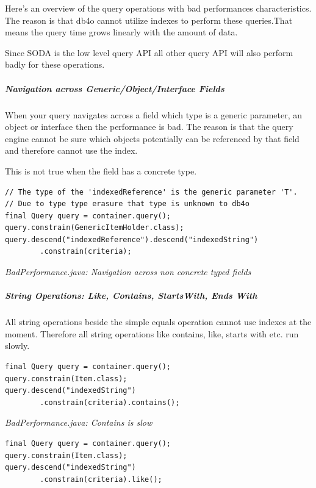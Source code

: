 Here's an overview of the query operations with bad performances characteristics. The reason is that db4o cannot utilize indexes to perform these queries.That means the query time grows linearly with the amount of data.

Since SODA is the low level query API all other query API will also perform badly for these operations.

\subparagraph*{Navigation across Generic/Object/Interface Fields}

When your query navigates across a field which type is a generic parameter, an object or interface then the performance is bad. The reason is that the query engine cannot be sure which objects potentially can be referenced by that field and therefore cannot use the index.

This is not true when the field has a concrete type.

\begin{lstlisting}
// The type of the 'indexedReference' is the generic parameter 'T'.
// Due to type type erasure that type is unknown to db4o
final Query query = container.query();
query.constrain(GenericItemHolder.class);
query.descend("indexedReference").descend("indexedString")
        .constrain(criteria);
\end{lstlisting}

{\small\itshape BadPerformance.java: Navigation across non concrete typed fields\par}
\medskip

\subparagraph*{String Operations: Like, Contains, StartsWith, Ends With}

All string operations beside the simple equals operation cannot use indexes at the moment. Therefore all string operations like contains, like, starts with etc. run slowly.

\begin{lstlisting}
final Query query = container.query();
query.constrain(Item.class);
query.descend("indexedString")
        .constrain(criteria).contains();
\end{lstlisting}

{\small\itshape BadPerformance.java: Contains is slow\par}
\medskip

\begin{lstlisting}
final Query query = container.query();
query.constrain(Item.class);
query.descend("indexedString")
        .constrain(criteria).like();
\end{lstlisting}

